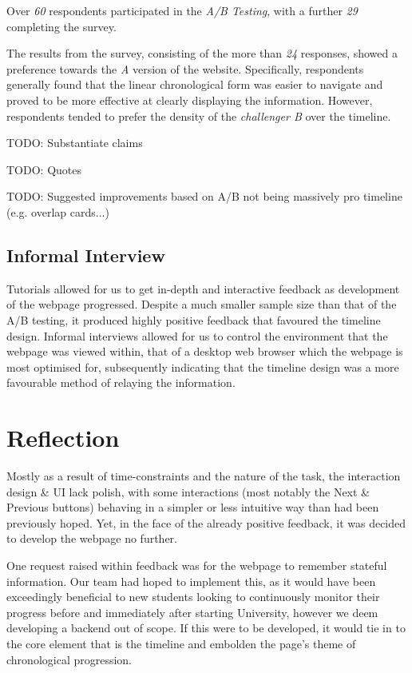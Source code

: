 \documentclass[a4paper, notoc]{tufte-handout}
\begin{document}
Over \emph{60} respondents participated in the \textit{A/B Testing}, with a further \emph{29} completing the survey.

The results from the survey, consisting of the more than \emph{24} responses, showed 
a preference towards the \textit{A} version of the website. Specifically, respondents 
generally found that the linear chronological form was easier to navigate and proved to be more 
effective at clearly displaying the information. However, respondents tended to prefer the density
of the \textit{challenger B} over the timeline. 

TODO: Substantiate claims

TODO: Quotes

TODO: Suggested improvements based on A/B not being massively pro timeline (e.g. overlap cards...)

\subsection{Informal Interview}\label{subsec:interview}

Tutorials allowed for us to get in-depth and interactive feedback as development of the webpage progressed. Despite a much smaller sample size than that of the A/B testing, it produced highly positive feedback that favoured the timeline design. Informal interviews allowed for us to control the environment that the webpage was viewed within, that of a desktop web browser which the webpage is most optimised for, subsequently indicating that the timeline design was a more favourable method of relaying the information.

\section{Reflection}


Mostly as a result of time-constraints and the nature of the task, the interaction design \& UI lack 
polish, with some interactions (most notably the Next \& Previous buttons) behaving in a simpler 
or less intuitive way than had been previously hoped. Yet, in the face of the already positive feedback, it was 
decided to develop the webpage no further.

One request raised within feedback was for the webpage to remember stateful information. Our 
team had hoped to implement this, as it would have been exceedingly beneficial to new students 
looking to continuously monitor their progress before and immediately after starting University, 
however we deem developing a backend out of scope. If this were to be developed, it would tie 
in to the core element that is the timeline and embolden the page's theme of chronological progression.
\end{document}
